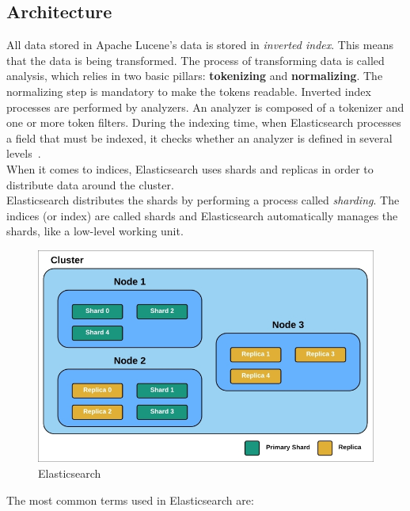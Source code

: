 \subsection{Architecture}
All data stored in Apache Lucene's data is stored in \textit{inverted index}. This means that the data is being transformed. The process of transforming data is called analysis, which relies in two basic pillars: \textbf{tokenizing} and \textbf{normalizing}. The normalizing step is mandatory to make the tokens readable. Inverted index processes are performed by analyzers. An analyzer is composed of a tokenizer and one or more token filters. During the indexing time, when Elasticsearch processes a field that must be indexed, it checks whether an analyzer is defined in several levels~\cite{elastic1}.\\
When it comes to indices, Elasticsearch uses shards and replicas in order to distribute data around the cluster.\\
Elasticsearch distributes the shards by performing a process called \textit{sharding}. The indices (or index) are called shards and Elasticsearch automatically manages the shards, like a low-level working unit.
\begin{figure}
	\includegraphics[width=\linewidth]{img/elasticsearch.jpeg}
	\caption{Elasticsearch~\cite{elastic3}}
	\label{fig:elastic1}
\end{figure}
The most common terms used in Elasticsearch are:
